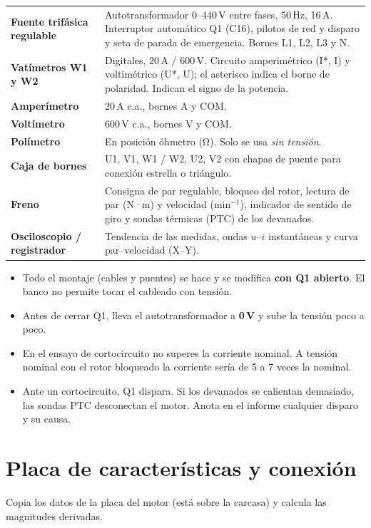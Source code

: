 \documentclass[11pt,a4paper]{article}
\begin{document}
\begin{tabularx}{\textwidth}{@{}>{\bfseries}l X@{}}
  \toprule
  Fuente trifásica regulable & Autotransformador 0–440\,V entre fases, 50\,Hz, 16\,A. Interruptor automático Q1 (C16), pilotos de red y disparo y seta de parada de emergencia. Bornes L1, L2, L3 y N. \\
  Vatímetros W1 y W2 & Digitales, 20\,A / 600\,V. Circuito amperimétrico (I*, I) y voltimétrico (U*, U); el asterisco indica el borne de polaridad. Indican el signo de la potencia. \\
  Amperímetro & 20\,A c.a., bornes A y COM. \\
  Voltímetro & 600\,V c.a., bornes V y COM. \\
  Polímetro & En posición óhmetro (Ω). Solo se usa \emph{sin tensión}. \\
  Caja de bornes & U1, V1, W1 / W2, U2, V2 con chapas de puente para conexión estrella o triángulo. \\
  Freno & Consigna de par regulable, bloqueo del rotor, lectura de par (N·m) y velocidad (min$^{-1}$), indicador de sentido de giro y sondas térmicas (PTC) de los devanados. \\
  Osciloscopio / registrador & Tendencia de las medidas, ondas $u$–$i$ instantáneas y curva par–velocidad (X–Y). \\
  \bottomrule
\end{tabularx}

\begin{seguridad}
  \begin{itemize}[leftmargin=12pt]
    \item Todo el montaje (cables y puentes) se hace y se modifica \textbf{con Q1 abierto}. El banco no permite tocar el cableado con tensión.
    \item Antes de cerrar Q1, lleva el autotransformador a \textbf{0\,V} y sube la tensión poco a poco.
    \item En el ensayo de cortocircuito no superes la corriente nominal. A tensión nominal con el rotor bloqueado la corriente sería de 5 a 7 veces la nominal.
    \item Ante un cortocircuito, Q1 dispara. Si los devanados se calientan demasiado, las sondas PTC desconectan el motor. Anota en el informe cualquier disparo y su causa.
  \end{itemize}
\end{seguridad}

\section{Placa de características y conexión}
Copia los datos de la placa del motor (está sobre la carcasa) y calcula las magnitudes derivadas.
\end{document}
